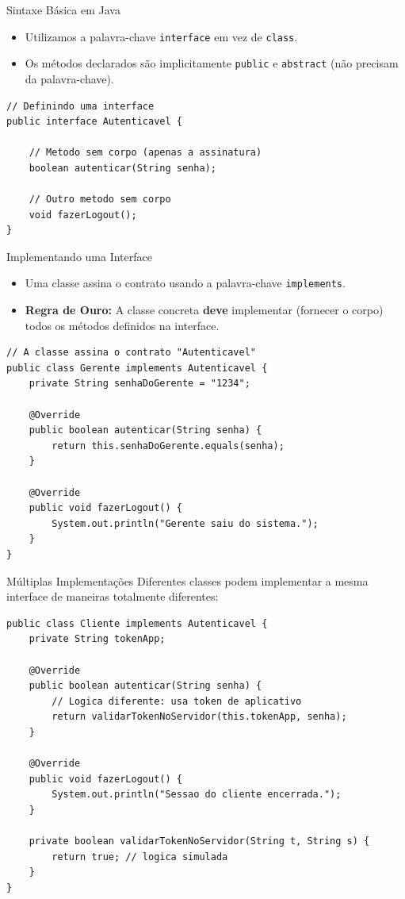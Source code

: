 \documentclass[9pt]{beamer}
\begin{document}
\begin{frame}[fragile]{Sintaxe Básica em Java}
    \begin{itemize}
        \item Utilizamos a palavra-chave \texttt{interface} em vez de \texttt{class}.
        \item Os métodos declarados são implicitamente \texttt{public} e \texttt{abstract} (não precisam da palavra-chave).
    \end{itemize}
    \begin{lstlisting}
// Definindo uma interface
public interface Autenticavel {
    
    // Metodo sem corpo (apenas a assinatura)
    boolean autenticar(String senha);
    
    // Outro metodo sem corpo
    void fazerLogout();
}
    \end{lstlisting}
\end{frame}

\begin{frame}[fragile]{Implementando uma Interface}
    \begin{itemize}
        \item Uma classe assina o contrato usando a palavra-chave \texttt{implements}.
        \item \textbf{Regra de Ouro:} A classe concreta \textbf{deve} implementar (fornecer o corpo) todos os métodos definidos na interface.
    \end{itemize}
    \begin{lstlisting}
// A classe assina o contrato "Autenticavel"
public class Gerente implements Autenticavel {
    private String senhaDoGerente = "1234";

    @Override
    public boolean autenticar(String senha) {
        return this.senhaDoGerente.equals(senha);
    }

    @Override
    public void fazerLogout() {
        System.out.println("Gerente saiu do sistema.");
    }
}
    \end{lstlisting}
\end{frame}

\begin{frame}[fragile]{Múltiplas Implementações}
    Diferentes classes podem implementar a mesma interface de maneiras totalmente diferentes:
    \begin{lstlisting}
public class Cliente implements Autenticavel {
    private String tokenApp;

    @Override
    public boolean autenticar(String senha) {
        // Logica diferente: usa token de aplicativo
        return validarTokenNoServidor(this.tokenApp, senha);
    }

    @Override
    public void fazerLogout() {
        System.out.println("Sessao do cliente encerrada.");
    }
    
    private boolean validarTokenNoServidor(String t, String s) {
        return true; // logica simulada
    }
}
    \end{lstlisting}
\end{frame}
\end{document}
